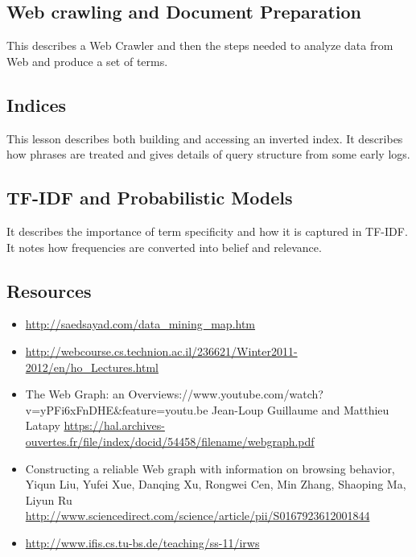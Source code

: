 \subsection{Web crawling and Document
Preparation}\label{web-crawling-and-document-preparation}


This describes a Web Crawler and then the steps needed to analyze data
from Web and produce a set of terms.



\subsection{Indices}\label{indices}


This lesson describes both building and accessing an inverted index. It
describes how phrases are treated and gives details of query structure
from some early logs.



\subsection{TF-IDF and Probabilistic
Models}\label{tf-idf-and-probabilistic-models}


It describes the importance of term specificity and how it is captured
in TF-IDF. It notes how frequencies are converted into belief and
relevance.



\subsection{Resources}\label{resources}

\begin{itemize}

\item
  \url{http://saedsayad.com/data_mining_map.htm}
\item
  \url{http://webcourse.cs.technion.ac.il/236621/Winter2011-2012/en/ho_Lectures.html}
\item
  The Web Graph: an
  Overviews://www.youtube.com/watch?v=yPFi6xFnDHE\&feature=youtu.be
  Jean-Loup Guillaume and Matthieu Latapy
  \url{https://hal.archives-ouvertes.fr/file/index/docid/54458/filename/webgraph.pdf}
\item
  Constructing a reliable Web graph with information on browsing
  behavior, Yiqun Liu, Yufei Xue, Danqing Xu, Rongwei Cen, Min Zhang,
  Shaoping Ma, Liyun Ru
  \url{http://www.sciencedirect.com/science/article/pii/S0167923612001844}
\item
  \url{http://www.ifis.cs.tu-bs.de/teaching/ss-11/irws}
\end{itemize}

